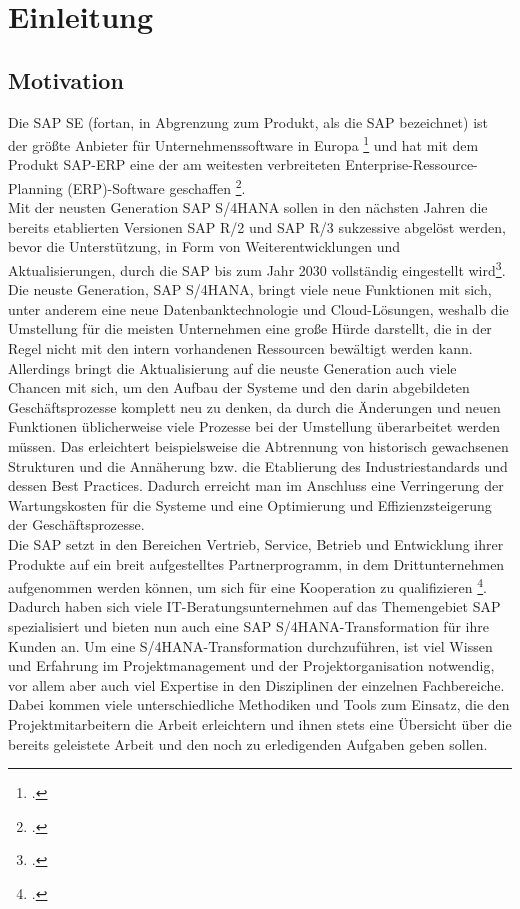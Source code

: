 \section{Einleitung}
\subsection{Motivation}
Die SAP SE (fortan, in Abgrenzung zum Produkt, als \glqq{}die\grqq{} SAP bezeichnet) ist der größte Anbieter für Unternehmenssoftware in Europa \footcite[Vgl.][]{sap-about} und hat mit dem Produkt SAP-ERP eine der am weitesten verbreiteten Enterprise-Ressource-Planning (ERP)-Software geschaffen \footcite[Vgl.][]{sap-about}. \\Mit der neusten Generation SAP S/4HANA sollen in den nächsten Jahren die bereits etablierten Versionen SAP R/2 und SAP R/3 sukzessive abgelöst werden, bevor die Unterstützung, in Form von Weiterentwicklungen und Aktualisierungen, durch die SAP bis zum Jahr 2030 vollständig eingestellt wird\footcite[Vgl.][]{sap-support}. Die neuste Generation, SAP S/4HANA, bringt viele neue Funktionen mit sich, unter anderem eine neue Datenbanktechnologie und Cloud-Lösungen, weshalb die Umstellung für die meisten Unternehmen eine große Hürde darstellt, die in der Regel nicht mit den intern vorhandenen Ressourcen bewältigt werden kann. Allerdings bringt die Aktualisierung auf die neuste Generation auch viele Chancen mit sich, um den Aufbau der Systeme und den darin abgebildeten Geschäftsprozesse komplett neu zu denken, da durch die Änderungen und neuen Funktionen üblicherweise viele Prozesse bei der Umstellung überarbeitet werden müssen. Das erleichtert beispielsweise die Abtrennung von historisch gewachsenen Strukturen und die Annäherung bzw. die Etablierung des Industriestandards und dessen Best Practices. Dadurch erreicht man im Anschluss eine Verringerung der Wartungskosten für die Systeme und eine Optimierung und Effizienzsteigerung der Geschäftsprozesse.\\ 
Die SAP setzt in den Bereichen Vertrieb, Service, Betrieb und  Entwicklung ihrer Produkte auf ein breit aufgestelltes Partnerprogramm, in dem Drittunternehmen aufgenommen werden können, um sich für eine Kooperation zu qualifizieren \footcite[Vgl.][]{sap-partner}. Dadurch haben sich viele IT-Beratungsunternehmen auf das Themengebiet SAP spezialisiert und bieten nun auch eine SAP S/4HANA-Transformation für ihre Kunden an. Um eine S/4HANA-Transformation durchzuführen, ist viel Wissen und Erfahrung im Projektmanagement und der Projektorganisation notwendig, vor allem aber auch viel Expertise in den Disziplinen der einzelnen Fachbereiche. Dabei kommen viele unterschiedliche Methodiken und Tools zum Einsatz, die den Projektmitarbeitern die Arbeit erleichtern und ihnen stets eine Übersicht über die bereits geleistete Arbeit und den noch zu erledigenden Aufgaben geben sollen. 

